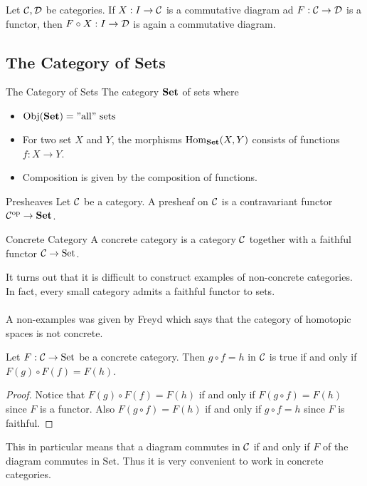 \documentclass[a4paper]{article}
\begin{document}
\begin{prp}{}{} Let $\mathcal{C},\mathcal{D}$ be categories. If $X:I\to\mathcal{C}$ is a commutative diagram ad $F:\mathcal{C}\to\mathcal{D}$ is a functor, then $F\circ X:I\to\mathcal{D}$ is again a commutative diagram. 
\end{prp}

\subsection{The Category of Sets}
\begin{defn}{The Category of Sets}{} The category $\bold{Set}$ of sets where 
\begin{itemize}
\item $\operatorname{Obj}(\bold{Set})=\text{''all'' sets}$
\item For two set $X$ and $Y$, the morphisms $\operatorname{Hom}_\bold{Set}(X,Y)$ consists of functions $f:X\to Y$. 
\item Composition is given by the composition of functions. 
\end{itemize}
\end{defn}

\begin{defn}{Presheaves}{} Let $\mathcal{C}$ be a category. A presheaf on $\mathcal{C}$ is a contravariant functor $\mathcal{C}^\text{op}\to\bold{Set}$. 
\end{defn}

\begin{defn}{Concrete Category}{} A concrete category is a category $\mathcal{C}$ together with a faithful functor $\mathcal{C}\to\text{Set}$. 
\end{defn}

It turns out that it is difficult to construct examples of non-concrete categories. In fact, every small category admits a faithful functor to sets. \\~\\
A non-examples was given by Freyd which says that the category of homotopic spaces is not concrete. 

\begin{prp}{}{} Let $F:\mathcal{C}\to\text{Set}$ be a concrete category. Then $g\circ f=h$ in $\mathcal{C}$ is true if and only if $F(g)\circ F(f)=F(h)$. \tcbline
\begin{proof}
Notice that $F(g)\circ F(f)=F(h)$ if and only if $F(g\circ f)=F(h)$ since $F$ is a functor. Also $F(g\circ f)=F(h)$ if and only if $g\circ f=h$ since $F$ is faithful. 
\end{proof}
\end{prp}

This in particular means that a diagram commutes in $\mathcal{C}$ if and only if $F$ of the diagram commutes in $\text{Set}$. Thus it is very convenient to work in concrete categories. 
\end{document}
